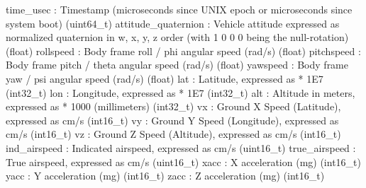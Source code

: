 \begin{DoxyVerb}
\begin{DoxyVerb}
\begin{DoxyVerb}
\begin{DoxyVerb}
\begin{DoxyVerb}
time_usec                 : Timestamp (microseconds since UNIX epoch or microseconds since system boot) (uint64_t)
attitude_quaternion        : Vehicle attitude expressed as normalized quaternion in w, x, y, z order (with 1 0 0 0 being the null-rotation) (float)
rollspeed                 : Body frame roll / phi angular speed (rad/s) (float)
pitchspeed                : Body frame pitch / theta angular speed (rad/s) (float)
yawspeed                  : Body frame yaw / psi angular speed (rad/s) (float)
lat                       : Latitude, expressed as * 1E7 (int32_t)
lon                       : Longitude, expressed as * 1E7 (int32_t)
alt                       : Altitude in meters, expressed as * 1000 (millimeters) (int32_t)
vx                        : Ground X Speed (Latitude), expressed as cm/s (int16_t)
vy                        : Ground Y Speed (Longitude), expressed as cm/s (int16_t)
vz                        : Ground Z Speed (Altitude), expressed as cm/s (int16_t)
ind_airspeed              : Indicated airspeed, expressed as cm/s (uint16_t)
true_airspeed             : True airspeed, expressed as cm/s (uint16_t)
xacc                      : X acceleration (mg) (int16_t)
yacc                      : Y acceleration (mg) (int16_t)
zacc                      : Z acceleration (mg) (int16_t)\end{DoxyVerb}
 \mbox{\label{classpymavlink_1_1dialects_1_1v10_1_1MAVLink_a90b361b95b8c4c5f238753a33e108d88}} 

\end{DoxyVerb}
\end{DoxyVerb}
\end{DoxyVerb}
\end{DoxyVerb}
